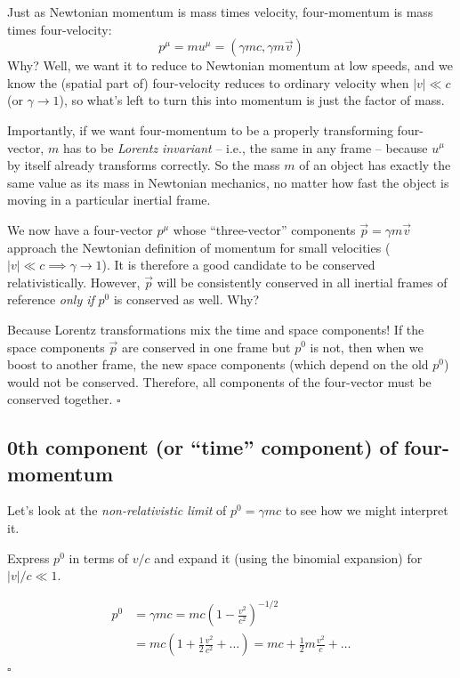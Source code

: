 \documentclass[11pt, letterpaper, openany]{book}
\newenvironment{exercise}[1][Exercise]{%
  \tcolorbox[blanker, breakable, left=1em,
    before skip=1em, after skip=1em,
    borderline west={3pt}{0pt}{PhysNavy},
    colback=PhysCream,
    before upper={\textcolor{PhysNavy}{\sffamily\bfseries #1:}\space}
  ]%
}{%
  \endtcolorbox%
}
\newenvironment{solution}[1][Solution]{%
  \tcolorbox[blanker, breakable, left=1em,
    before skip=1em, after skip=1em,
    borderline west={2pt}{0pt}{PhysTeal},
    colback=PhysCream,
    before upper={\textcolor{PhysTeal}{\sffamily\bfseries #1.}\space}
  ]%
}{%
  \hfill\textcolor{PhysTeal}{\ensuremath{\square}}\endtcolorbox%
}
\begin{document}
Just as Newtonian momentum is mass times velocity, four-momentum is mass times four-velocity:
\[ p^\mu = m u^\mu = (\gamma mc, \gamma m \vec{v}) \]
Why? Well, we want it to reduce to Newtonian momentum at low speeds, and we know the (spatial part of) four-velocity reduces to ordinary velocity when $|v| \ll c$ (or $\gamma \to 1$), so what's left to turn this into momentum is just the factor of mass.

Importantly, if we want four-momentum to be a properly transforming four-vector, $m$ has to be \textit{Lorentz invariant} -- i.e., the same in any frame -- because $u^\mu$ by itself already transforms correctly. So the mass $m$ of an object has exactly the same value as its mass in Newtonian mechanics, no matter how fast the object is moving in a particular inertial frame.

\begin{exercise}[Quick Exercise 8]
We now have a four-vector $p^\mu$ whose ``three-vector'' components $\vec{p} = \gamma m \vec{v}$ approach the Newtonian definition of momentum for small velocities ($|v| \ll c \implies \gamma \to 1$). It is therefore a good candidate to be conserved relativistically. However, $\vec{p}$ will be consistently conserved in all inertial frames of reference \textit{only if} $p^0$ is conserved as well. Why?
\end{exercise}
\begin{solution}
Because Lorentz transformations mix the time and space components! If the space components $\vec{p}$ are conserved in one frame but $p^0$ is not, then when we boost to another frame, the new space components (which depend on the old $p^0$) would not be conserved. Therefore, all components of the four-vector must be conserved together.
\end{solution}

\subsection{0th component (or ``time'' component) of four-momentum}

Let's look at the \textit{non-relativistic limit} of $p^0 = \gamma mc$ to see how we might interpret it.

\begin{exercise}[Exercise 9]
Express $p^0$ in terms of $v/c$ and expand it (using the binomial expansion) for $|v|/c \ll 1$.
\end{exercise}
\begin{solution}
\begin{align*}
    p^0 &= \gamma mc = mc \left(1 - \frac{v^2}{c^2}\right)^{-1/2} \\
    &= mc \left(1 + \frac{1}{2}\frac{v^2}{c^2} + \dots \right) = mc + \frac{1}{2}m\frac{v^2}{c} + \dots \tag*{use $(1+x)^n = 1+nx+\dots$}
\end{align*}
\end{solution}
\end{document}
